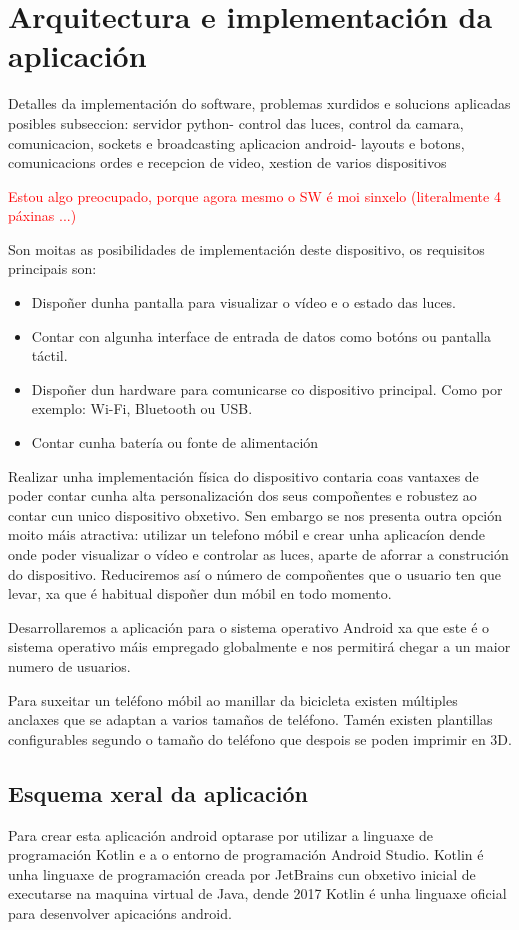 \chapter{Arquitectura e implementación da aplicación}
\label{chap:implementacion_aplicacion}
Detalles da implementación do software, problemas xurdidos e solucions aplicadas
posibles subseccion:
servidor python- control das luces, control da camara, comunicacion, sockets e broadcasting
aplicacion android- layouts e botons, comunicacions ordes e recepcion de video, xestion de varios dispositivos


\textcolor{red}{Estou algo preocupado, porque agora mesmo o SW é moi sinxelo (literalmente 4 páxinas ...)}


Son moitas as posibilidades de implementación deste dispositivo, os requisitos principais son:
\begin{itemize}
    \item Dispoñer dunha pantalla para visualizar o vídeo e o estado das luces.
    \item Contar con algunha interface de entrada de datos como botóns ou pantalla táctil.
    \item Dispoñer dun hardware para comunicarse co dispositivo principal. Como por exemplo: Wi-Fi, Bluetooth ou USB.
    \item Contar cunha batería ou fonte de alimentación
\end{itemize}

Realizar unha implementación física do dispositivo contaria coas vantaxes de poder contar cunha alta personalización dos seus compoñentes e robustez ao contar cun unico dispositivo obxetivo. Sen embargo se nos presenta outra opción moito máis atractiva: utilizar un telefono móbil e crear unha aplicacíon dende onde poder visualizar o vídeo e controlar as luces, aparte de aforrar a construción do dispositivo. Reduciremos así o número de compoñentes que o usuario ten que levar, xa que é habitual dispoñer dun móbil en todo momento.

Desarrollaremos a aplicación para o sistema operativo Android xa que este é o sistema operativo máis empregado globalmente e nos permitirá chegar a un maior numero de usuarios.

Para suxeitar un teléfono móbil ao manillar da bicicleta existen múltiples anclaxes que se adaptan a varios tamaños de teléfono. Tamén existen plantillas configurables segundo o tamaño do teléfono que despois se poden imprimir en 3D.

\section{Esquema xeral da aplicación}
Para crear esta aplicación android optarase por utilizar a linguaxe de programación Kotlin e a o entorno de programación Android Studio. Kotlin é unha linguaxe de programación creada por JetBrains cun obxetivo inicial de executarse na maquina virtual de Java, dende 2017 Kotlin é unha linguaxe oficial para desenvolver apicacións android.

